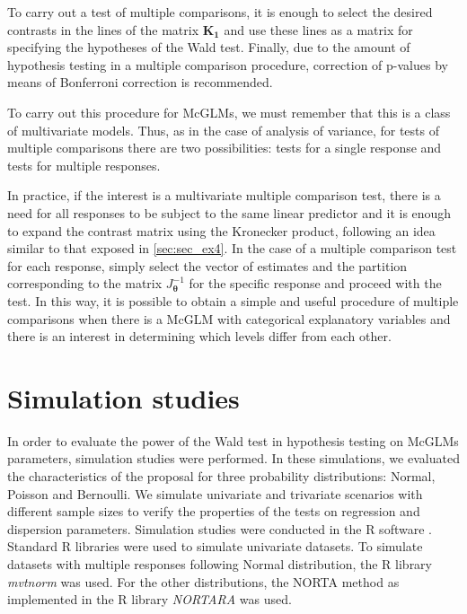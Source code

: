 \documentclass[USenglish]{article}
\theoremstyle{dgthm}
\theoremstyle{dgdef}
\begin{document}
To carry out a test of multiple comparisons, it is enough to select the desired contrasts in the lines of the matrix $\boldsymbol{K_1}$ and use these lines as a matrix for specifying the hypotheses of the Wald test. Finally, due to the amount of hypothesis testing in a multiple comparison procedure, correction of p-values by means of Bonferroni correction is recommended.

To carry out this procedure for McGLMs, we must remember that this is a class of multivariate models. Thus, as in the case of analysis of variance, for tests of multiple comparisons there are two possibilities: tests for a single response and tests for multiple responses. 

In practice, if the interest is a multivariate multiple comparison test, there is a need for all responses to be subject to the same linear predictor and it is enough to expand the contrast matrix using the Kronecker product, following an idea similar to that exposed in \autoref{sec:sec_ex4}. In the case of a multiple comparison test for each response, simply select the vector of estimates and the partition corresponding to the matrix  $J_{\boldsymbol{\theta}}^{-1}$ for the specific response and proceed with the test. In this way, it is possible to obtain a simple and useful procedure of multiple comparisons when there is a McGLM with categorical explanatory variables and there is an interest in determining which levels differ from each other.


\section{Simulation studies}\label{sec5}

In order to evaluate the power of the Wald test in hypothesis testing on McGLMs parameters, simulation studies were performed. In these simulations, we evaluated the characteristics of the proposal for three probability distributions: Normal, Poisson and Bernoulli. We simulate univariate and trivariate scenarios with different sample sizes to verify the properties of the tests on regression and dispersion parameters. Simulation studies were conducted in the R software \cite{R}. Standard R libraries were used to simulate univariate datasets. To simulate datasets with multiple responses following Normal distribution, the R library \emph{mvtnorm} \cite{mvtnorm1} \cite{mvtnorm2} was used. For the other distributions, the NORTA \cite{norta} method as implemented in the R library \emph{NORTARA} \cite{nortara} was used.
\end{document}
